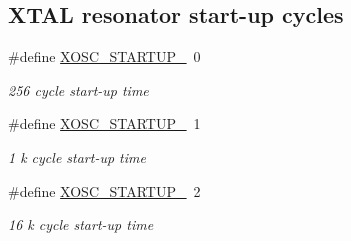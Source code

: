 \subsection*{X\-T\-A\-L resonator start-\/up cycles}
\begin{DoxyCompactItemize}
\item 
\hypertarget{group__osc__group_ga896fce6a4304eaa3fcd3bad84189bf9d}{\#define \hyperlink{group__osc__group_ga896fce6a4304eaa3fcd3bad84189bf9d}{X\-O\-S\-C\-\_\-\-S\-T\-A\-R\-T\-U\-P\-\_}~0}\label{group__osc__group_ga896fce6a4304eaa3fcd3bad84189bf9d}

\begin{DoxyCompactList}\small\item\em 256 cycle start-\/up time \end{DoxyCompactList}\item 
\hypertarget{group__osc__group_ga57a15ac318d399ca7a3218fbf3b56f12}{\#define \hyperlink{group__osc__group_ga57a15ac318d399ca7a3218fbf3b56f12}{X\-O\-S\-C\-\_\-\-S\-T\-A\-R\-T\-U\-P\-\_}~1}\label{group__osc__group_ga57a15ac318d399ca7a3218fbf3b56f12}

\begin{DoxyCompactList}\small\item\em 1 k cycle start-\/up time \end{DoxyCompactList}\item 
\hypertarget{group__osc__group_gaec4cce4e41f3612cbb4e0365d12d655d}{\#define \hyperlink{group__osc__group_gaec4cce4e41f3612cbb4e0365d12d655d}{X\-O\-S\-C\-\_\-\-S\-T\-A\-R\-T\-U\-P\-\_}~2}\label{group__osc__group_gaec4cce4e41f3612cbb4e0365d12d655d}

\begin{DoxyCompactList}\small\item\em 16 k cycle start-\/up time \end{DoxyCompactList}\end{DoxyCompactItemize}
